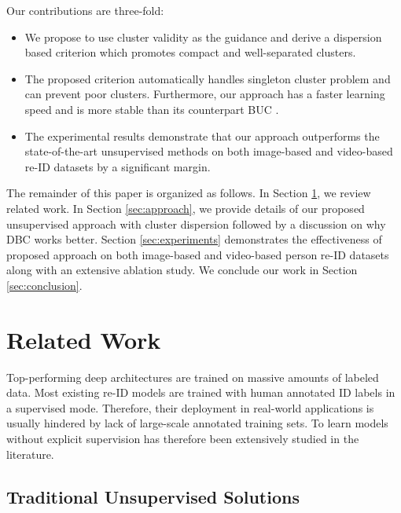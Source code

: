 \documentclass[journal]{IEEEtran}
\begin{document}
Our contributions are three-fold:
\begin{itemize}
    \item  We propose to use cluster validity as the guidance and derive a dispersion based criterion which promotes compact and well-separated clusters.
    \item The proposed criterion automatically handles singleton cluster problem and can prevent poor clusters. Furthermore, our approach has a faster learning speed and is more stable than its counterpart BUC \cite{lin2019bottom}.
\item The experimental results demonstrate that our approach outperforms the state-of-the-art unsupervised methods on both image-based and video-based re-ID datasets by a significant margin.
\end{itemize}

The remainder of this paper is organized as follows. In Section \ref{sec:related}, we review related work. In Section \ref{sec:approach}, we provide details of our proposed unsupervised approach with cluster dispersion followed by a discussion on why DBC works better. Section \ref{sec:experiments} demonstrates the effectiveness of proposed approach on both image-based and video-based person re-ID datasets along with an extensive ablation study. We conclude our work in Section \ref{sec:conclusion}.







\section{Related Work}
\label{sec:related}

Top-performing deep architectures are trained on massive amounts of labeled data. Most existing re-ID models are trained with human annotated ID labels in a supervised mode. Therefore, their deployment in real-world applications is usually hindered by lack of large-scale annotated training sets. To learn models without explicit supervision has therefore been extensively studied in the literature.


\subsection{Traditional Unsupervised Solutions}
\end{document}
